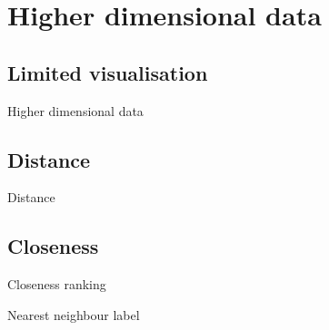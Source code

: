 \section{Higher dimensional data}

\subsection{Limited visualisation}

\begin{frame}{Higher dimensional data}
\end{frame}

\subsection{Distance}

\begin{frame}{Distance}
\end{frame}

\subsection{Closeness}

\begin{frame}{Closeness ranking}
\end{frame}

\begin{frame}{Nearest neighbour label}
\end{frame}
